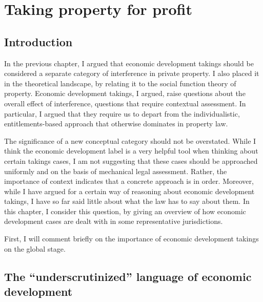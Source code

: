 \documentclass[12pt,a4paper]{book} %
\begin{document}
\chapter{Taking property for profit}\label{chap:2}

\section{Introduction}\label{sec:intro}

In the previous chapter, I argued that economic development takings should be considered a separate category of interference in private property. I also placed it in the theoretical landscape, by relating it to the social function theory of property. Economic development takings, I argued, raise questions about the overall effect of interference, questions that require contextual assessment. In particular, I argued that they require us to depart from the individualistic, entitlements-based approach that otherwise dominates in property law.

The significance of a new conceptual category should not be overstated. While I think the economic development label is a very helpful tool when thinking about certain takings cases, I am not suggesting that these cases should be approached uniformly and on the basis of mechanical legal assessment. Rather, the importance of context indicates that a concrete approach is in order. Moreover, while I have argued for a certain way of reasoning about economic development takings, I have so far said little about what the law has to say about them. In this chapter, I consider this question, by giving an overview of how economic development cases are dealt with in some representative jurisdictions.

First, I will comment briefly on the importance of economic development takings on the global stage.

\section{The ``underscrutinized'' language of economic development}\label{sec:lgppp}
\end{document}
